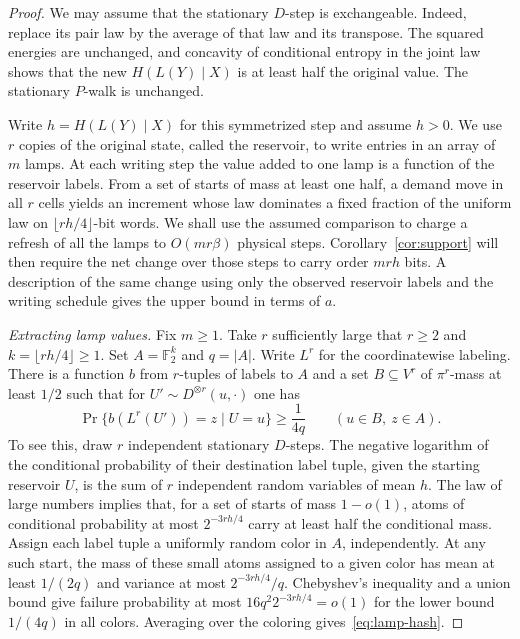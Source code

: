 \begin{proof}
We may assume that the stationary $D$-step is exchangeable. Indeed,
replace its pair law by the average of that law and its transpose.
The squared energies are unchanged, and concavity of conditional
entropy in the joint law shows that the new $H(L(Y)\mid X)$ is at
least half the original value. The stationary $P$-walk is unchanged.

Write $h=H(L(Y)\mid X)$ for this symmetrized step and assume $h>0$.
We use \(r\) copies of the original state, called the reservoir, to
write entries in an array of \(m\) lamps. At each writing step the
value added to one lamp is a function of the reservoir labels.
From a set of starts of mass at least one half, a demand move in all
\(r\) cells yields an increment whose law dominates a fixed fraction
of the uniform law on \(\lfloor rh/4\rfloor\)-bit words. We shall use the assumed
comparison to charge a refresh of all the lamps to \(O(mr\beta)\)
physical steps. Corollary~\ref{cor:support} will then require the net
change over those steps to carry order \(mrh\) bits. A description
of the same change using only the observed reservoir labels and the
writing schedule gives the upper bound in terms of \(a\).

\smallskip\noindent
\emph{Extracting lamp values.}
Fix \(m\ge1\). Take \(r\) sufficiently large that \(r\ge2\) and
\(k=\lfloor rh/4\rfloor\ge1\).
Set $A=\mathbb F_2^k$ and $q=|A|$. Write $L^r$ for the coordinatewise
labeling. There is a function $b$ from $r$-tuples of labels to $A$
and a set $B\subseteq V^r$ of $\pi^r$-mass at least $1/2$ such that
for $U'\sim D^{\otimes r}(u,\cdot)$ one has
\begin{equation}\label{eq:lamp-hash}
 \Pr\{b(L^r(U'))=z\mid U=u\}\ge \frac1{4q}
 \qquad(u\in B,\ z\in A).
\end{equation}
To see this, draw $r$ independent stationary $D$-steps. The negative
logarithm of the conditional probability of their destination label
tuple, given the starting reservoir $U$, is the sum of $r$ independent
random variables of mean $h$. The law of large numbers implies that,
for a set of starts of mass $1-o(1)$, atoms of conditional probability
at most $2^{-3rh/4}$ carry at least half the conditional mass. Assign
each label tuple a uniformly random color in $A$, independently. At
any such start, the mass of these small atoms assigned to a given
color has mean at least $1/(2q)$ and variance at most $2^{-3rh/4}/q$.
Chebyshev's inequality and a union bound give failure probability at
most $16q^2 2^{-3rh/4}=o(1)$ for the lower bound $1/(4q)$ in all
colors. Averaging over the coloring gives~\eqref{eq:lamp-hash}.


\end{proof}
